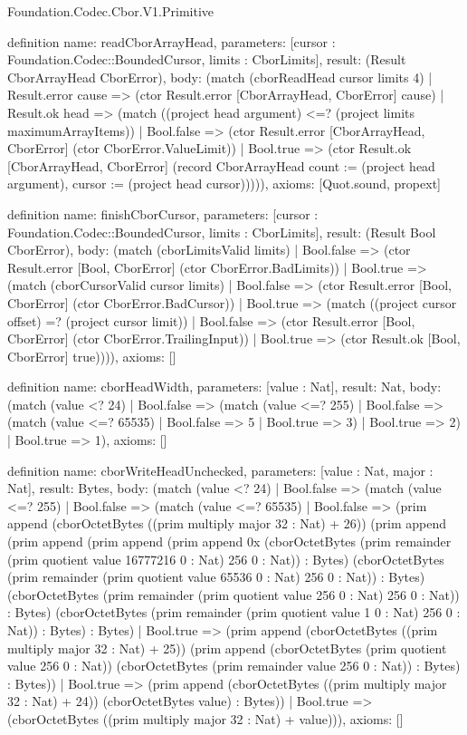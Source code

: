 \begin{lexlean}{Foundation.Codec.Cbor.V1.Primitive}
\begin{semanticmodule}
definition{
  name: readCborArrayHead,
  parameters: [cursor : Foundation.Codec::BoundedCursor, limits : CborLimits],
  result: (Result CborArrayHead CborError),
  body: (match (cborReadHead cursor limits 4)
    | Result.error cause => (ctor Result.error [CborArrayHead, CborError] cause)
    | Result.ok head => (match ((project head argument) <=? (project limits maximumArrayItems))
      | Bool.false => (ctor Result.error [CborArrayHead, CborError] (ctor CborError.ValueLimit))
      | Bool.true => (ctor Result.ok [CborArrayHead, CborError] (record CborArrayHead {count := (project head argument), cursor := (project head cursor)})))),
  axioms: [Quot.sound, propext]
}

definition{
  name: finishCborCursor,
  parameters: [cursor : Foundation.Codec::BoundedCursor, limits : CborLimits],
  result: (Result Bool CborError),
  body: (match (cborLimitsValid limits)
    | Bool.false => (ctor Result.error [Bool, CborError] (ctor CborError.BadLimits))
    | Bool.true => (match (cborCursorValid cursor limits)
      | Bool.false => (ctor Result.error [Bool, CborError] (ctor CborError.BadCursor))
      | Bool.true => (match ((project cursor offset) =? (project cursor limit))
        | Bool.false => (ctor Result.error [Bool, CborError] (ctor CborError.TrailingInput))
        | Bool.true => (ctor Result.ok [Bool, CborError] true)))),
  axioms: []
}

definition{
  name: cborHeadWidth,
  parameters: [value : Nat],
  result: Nat,
  body: (match (value <? 24)
    | Bool.false => (match (value <=? 255)
      | Bool.false => (match (value <=? 65535) | Bool.false => 5 | Bool.true => 3)
      | Bool.true => 2)
    | Bool.true => 1),
  axioms: []
}

definition{
  name: cborWriteHeadUnchecked,
  parameters: [value : Nat, major : Nat],
  result: Bytes,
  body: (match (value <? 24)
    | Bool.false => (match (value <=? 255)
      | Bool.false => (match (value <=? 65535)
        | Bool.false => (prim append (cborOctetBytes ((prim multiply major 32 : Nat) + 26)) (prim append (prim append (prim append (prim append 0x (cborOctetBytes (prim remainder (prim quotient value 16777216 0 : Nat) 256 0 : Nat)) : Bytes) (cborOctetBytes (prim remainder (prim quotient value 65536 0 : Nat) 256 0 : Nat)) : Bytes) (cborOctetBytes (prim remainder (prim quotient value 256 0 : Nat) 256 0 : Nat)) : Bytes) (cborOctetBytes (prim remainder (prim quotient value 1 0 : Nat) 256 0 : Nat)) : Bytes) : Bytes)
        | Bool.true => (prim append (cborOctetBytes ((prim multiply major 32 : Nat) + 25)) (prim append (cborOctetBytes (prim quotient value 256 0 : Nat)) (cborOctetBytes (prim remainder value 256 0 : Nat)) : Bytes) : Bytes))
      | Bool.true => (prim append (cborOctetBytes ((prim multiply major 32 : Nat) + 24)) (cborOctetBytes value) : Bytes))
    | Bool.true => (cborOctetBytes ((prim multiply major 32 : Nat) + value))),
  axioms: []
}


\end{semanticmodule}
\end{lexlean}
